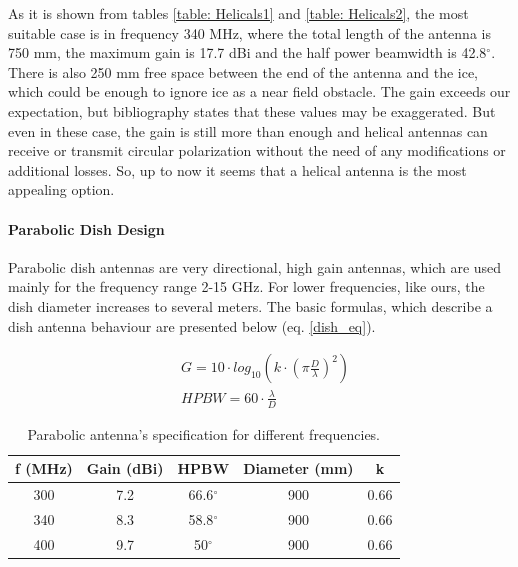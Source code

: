 As it is shown from tables \ref{table: Helicals1} and \ref{table: Helicals2}, the most suitable case is in frequency 340 MHz, where the total length of the antenna is 750 mm, the maximum gain is 17.7 dBi and the half power beamwidth is 42.8$^\circ$. There is also 250 mm free space between the end of the antenna and the ice, which could be enough to ignore ice as a near field obstacle. The gain exceeds our expectation, but bibliography states that these values may be exaggerated. But even in these case, the gain is still more than enough and helical antennas can receive or transmit circular polarization without the need of any modifications or additional losses. So, up to now it seems that a helical antenna is the most appealing option.

\paragraph{Parabolic Dish Design}
Parabolic dish antennas are very directional, high gain antennas, which are used mainly for the frequency range 2-15 GHz. For lower frequencies, like ours, the dish diameter increases to several meters. The basic formulas, which describe a dish antenna behaviour are presented below (eq. \ref{dish_eq}).

\begin{subequations}
\begin{align}
    &G=10 \cdot log_{10}(k \cdot (\pi \frac{D}{\lambda})^2) \\
    &HPBW=60 \cdot \frac{\lambda}{D}
\end{align}
\label{dish_eq}
\end{subequations}

\begin{table}[htb]
\centering
\begin{tabular}{| c | c | c | c | c |}
\hline
 f (MHz) & Gain (dBi) & HPBW & Diameter (mm) & k \\ 
 \hline
 300 & 7.2 & 66.6$^\circ$ & 900 & 0.66 \\  
 \hline
 340 & 8.3 & 58.8$^\circ$ & 900 & 0.66\\
 \hline
  400 & 9.7 & 50$^\circ$ & 900 & 0.66\\
 \hline
\end{tabular}
\caption{Parabolic antenna's specification for different frequencies.}
\label{table: dish}
\end{table}


